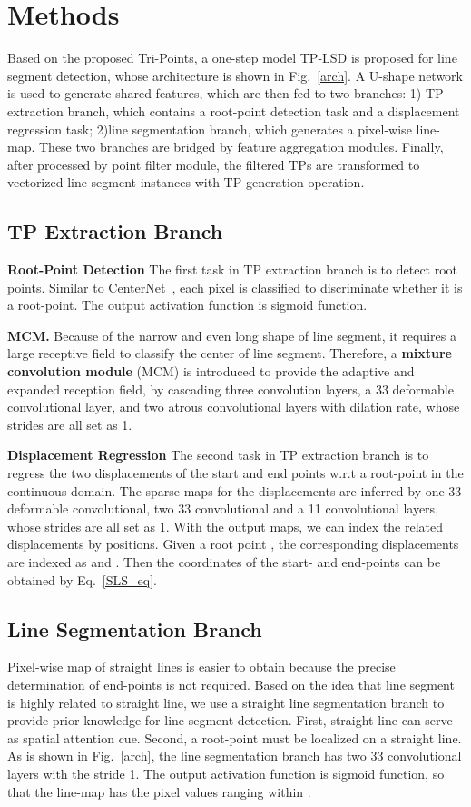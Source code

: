\documentclass[runningheads]{llncs}
\begin{document}
\section{Methods}


Based on the proposed Tri-Points, a one-step model TP-LSD is proposed for line segment detection, whose architecture is shown in Fig.~\ref{arch}. A U-shape network is used to generate shared features, which are then fed to two branches: 1) TP extraction branch, which contains a root-point detection task and a displacement regression task; 2)line segmentation branch, which generates a pixel-wise line-map. These two branches are bridged by feature aggregation modules. Finally, after processed by point filter module, the filtered TPs are transformed to vectorized line segment instances with TP generation operation.


\subsection{TP Extraction Branch}

\textbf{Root-Point Detection}
The first task in TP extraction branch is to detect root points. Similar to CenterNet~\cite{CenterNet}, each pixel is classified to discriminate whether it is a root-point. The output activation function is sigmoid function.

\textbf{MCM.}
Because of the narrow and even long shape of line segment, it requires a large receptive field to classify the center of line segment. Therefore, a \textbf{mixture convolution module} (MCM) is introduced to provide the adaptive and expanded reception field, by cascading three convolution layers, a 33 deformable convolutional layer, and two  atrous convolutional layers with dilation rate, whose strides are all set as 1.

\textbf{Displacement Regression}
The second task in TP extraction branch is to regress the two displacements of the start and end points w.r.t a root-point in the continuous domain. The sparse maps for the displacements are inferred by one 33 deformable convolutional, two 33 convolutional and a 11 convolutional layers, whose strides are all set as 1. With the output maps, we can index the related displacements by positions. Given a root point , the corresponding displacements are indexed as  and . Then the coordinates of the start- and end-points can be obtained by Eq.~\eqref{SLS_eq}.


\subsection{Line Segmentation Branch}
Pixel-wise map of straight lines is easier to obtain because the precise determination of end-points is not required. Based on the idea that line segment is highly related to straight line, we use a straight line segmentation branch to provide prior knowledge for line segment detection. First, straight line can serve as spatial attention cue. Second, a root-point must be localized on a straight line. As is shown in Fig.~\ref{arch}, the line segmentation branch has two 33 convolutional layers with the stride 1. The output activation function is sigmoid function, so that the line-map  has the pixel values ranging within .
\end{document}
